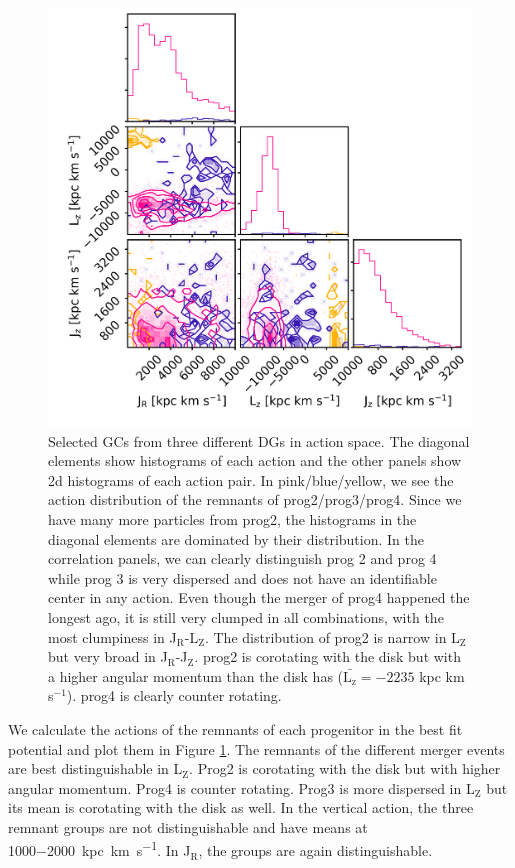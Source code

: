 \begin{figure}[htbp]
\captionsetup{format=plain}
    \centering
    \includegraphics[width=1.0\textwidth]{plots/Dynamics/prog234_actions_snap_127.png}
    \caption{Selected \acp{GC} from three different \acp{DG} in action space. The diagonal elements show histograms of each action and the other panels show 2d histograms of each action pair. In pink/blue/yellow, we see the action distribution of the remnants of prog2/prog3/prog4. Since we have many more particles from prog2, the histograms in the diagonal elements are dominated by their distribution. In the correlation panels, we can clearly distinguish prog 2 and prog 4 while prog 3 is very dispersed and does not have an identifiable center in any action. Even though the merger of prog4 happened the longest ago, it is still very clumped in all combinations, with the most clumpiness in J$_\mathrm{R}$-L$_\mathrm{Z}$. The distribution of prog2 is narrow in L$_\mathrm{Z}$ but very broad in J$_\mathrm{R}$-J$_\mathrm{Z}$. prog2 is corotating with the disk but with a higher angular momentum than the disk has (\(\bar{\mathrm{L_z}} = -2235\) kpc km s$^{-1}$). prog4 is clearly counter rotating.}
    \label{fig:act_all_merg_best_pot}
\end{figure}
We calculate the actions of the remnants of each progenitor in the best fit potential and plot them in Figure \ref{fig:act_all_merg_best_pot}. The remnants of the different merger events are best distinguishable in L$_\mathrm{Z}$. Prog2 is corotating with the disk but with higher angular momentum. Prog4 is counter rotating. Prog3 is more dispersed in L$_\mathrm{Z}$ but its mean is corotating with the disk as well. In the vertical action, the three remnant groups are not distinguishable and have means at \SI{1000-2000}{kpc.km.s^{-1}}. In J$_\mathrm{R}$, the groups are again distinguishable. 
